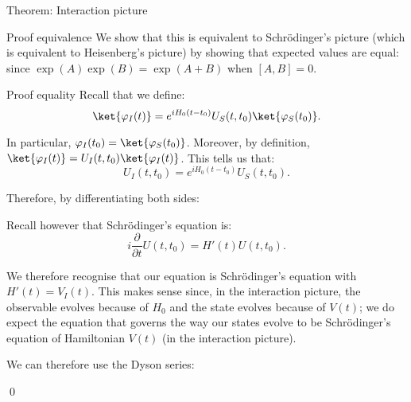 \documentclass[a4paper]{article}
\begin{document}
\begin{parag}{Theorem: Interaction picture}
    \begin{subparag}{Proof equivalence}
        We show that this is equivalent to Schrödinger's picture (which is equivalent to Heisenberg's picture) by showing that expected values are equal: 
        since $\exp\left(A\right)\exp\left(B\right) = \exp\left(A+B\right)$ when $\left[A, B\right] = 0$.
    \end{subparag}

    \begin{subparag}{Proof equality}
        Recall that we define: 
        \[\ket{\phi_I\left(t\right)} = e^{i H_0\left(t - t_0\right)} U_S\left(t, t_0\right) \ket{\phi_S\left(t_0\right)}.\]

        In particular, $\phi_I\left(t_0\right) = \ket{\phi_S\left(t_0\right)}$. Moreover, by definition, $\ket{\phi_I\left(t\right)} = U_I\left(t, t_0\right) \ket{\phi_I\left(t\right)}$. This tells us that:
        \[U_I\left(t, t_0\right) = e^{i H_0 \left(t - t_0\right)} U_S\left(t, t_0\right).\]
        

        Therefore, by differentiating both sides:

        Recall however that Schrödinger's equation is: 
        \[i \frac{\partial}{\partial t} U\left(t, t_0\right) = H'\left(t\right) U\left(t, t_0\right).\]

        We therefore recognise that our equation is Schrödinger's equation with $H'\left(t\right) = V_I\left(t\right)$. This makes sense since, in the interaction picture, the observable evolves because of $H_0$ and the state evolves because of $V\left(t\right)$; we do expect the equation that governs the way our states evolve to be Schrödinger's equation of Hamiltonian $V\left(t\right)$ (in the interaction picture).

        We can therefore use the Dyson series:

        \qed
    \end{subparag}
\end{parag}
\end{document}
